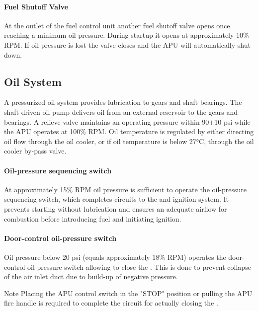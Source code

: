 \paragraph*{Fuel Shutoff Valve}
\label{par:fuel-shutoff-valve}
At the outlet of the fuel control unit another fuel shutoff valve opens once reaching a minimum oil pressure. During startup it opens at approximately 10\% \gls{RPM}. If oil pressure is lost the valve closes and the \gls{APU} will automatically shut down.

\subsection{Oil System}

A pressurized oil system provides lubrication to gears and shaft bearings. The shaft driven oil pump delivers oil from an external reservoir to the gears and bearings. A relieve valve maintains an operating pressure within 90$\pm$10 \gls{psi} while the \gls{APU} operates at 100\% \gls{RPM}. Oil temperature is regulated by either directing oil flow through the oil cooler, or if oil temperature is below 27°C, through the oil cooler by-pass valve.

\paragraph*{Oil-pressure sequencing switch}
At approximately 15\% \gls{RPM} oil pressure is sufficient to operate the oil-pressure sequencing switch, which completes circuits to the  and ignition system. It prevents starting without lubrication and ensures an adequate airflow for combustion before introducing fuel and initiating ignition.

\paragraph*{Door-control oil-pressure switch}
Oil pressure below 20 \gls{psi} (equals approximately 18\% \gls{RPM}) operates the door-control oil-pressure switch allowing to close the . This is done to prevent collapse of the air inlet duct due to build-up of negative pressure.

\begin{bclogo}[logo=\bclampe, ombre=false, couleurBarre=blue, marge=18, noborder=true]{ Note}
\indent
Placing the APU control switch in the "STOP" position or pulling the APU fire handle is required to complete the circuit for actually closing the .
\end{bclogo}

